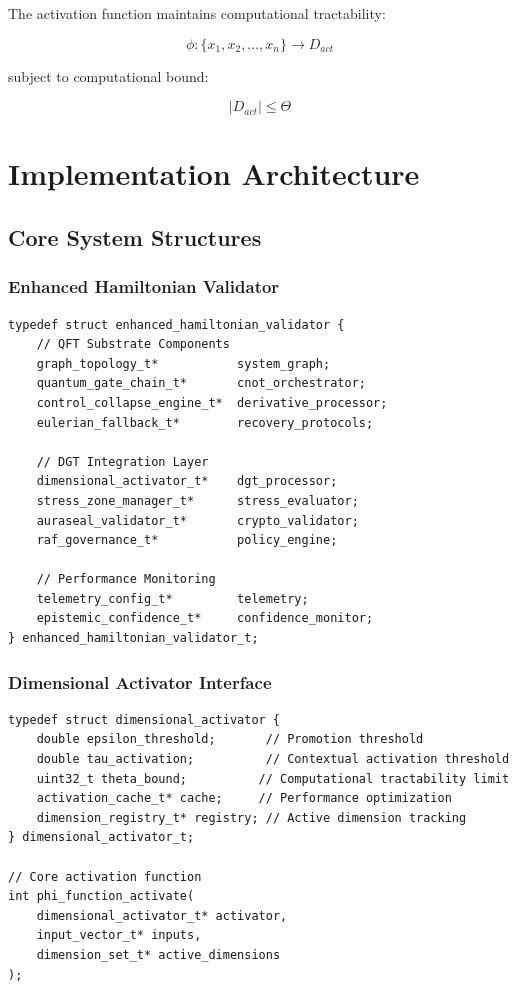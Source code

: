 \documentclass[12pt]{article}
\begin{document}
The activation function maintains computational tractability:

\begin{equation}
\phi : \{x_1, x_2, \ldots, x_n\} \rightarrow D_{act}
\end{equation}

subject to computational bound:

\begin{equation}
|D_{act}| \leq \Theta
\end{equation}

\section{Implementation Architecture}

\subsection{Core System Structures}

\subsubsection{Enhanced Hamiltonian Validator}

\begin{lstlisting}
typedef struct enhanced_hamiltonian_validator {
    // QFT Substrate Components
    graph_topology_t*           system_graph;
    quantum_gate_chain_t*       cnot_orchestrator;
    control_collapse_engine_t*  derivative_processor;
    eulerian_fallback_t*        recovery_protocols;
    
    // DGT Integration Layer
    dimensional_activator_t*    dgt_processor;
    stress_zone_manager_t*      stress_evaluator;
    auraseal_validator_t*       crypto_validator;
    raf_governance_t*           policy_engine;
    
    // Performance Monitoring
    telemetry_config_t*         telemetry;
    epistemic_confidence_t*     confidence_monitor;
} enhanced_hamiltonian_validator_t;
\end{lstlisting}

\subsubsection{Dimensional Activator Interface}

\begin{lstlisting}
typedef struct dimensional_activator {
    double epsilon_threshold;       // Promotion threshold
    double tau_activation;          // Contextual activation threshold
    uint32_t theta_bound;          // Computational tractability limit
    activation_cache_t* cache;     // Performance optimization
    dimension_registry_t* registry; // Active dimension tracking
} dimensional_activator_t;

// Core activation function
int phi_function_activate(
    dimensional_activator_t* activator,
    input_vector_t* inputs,
    dimension_set_t* active_dimensions
);
\end{lstlisting}
\end{document}
